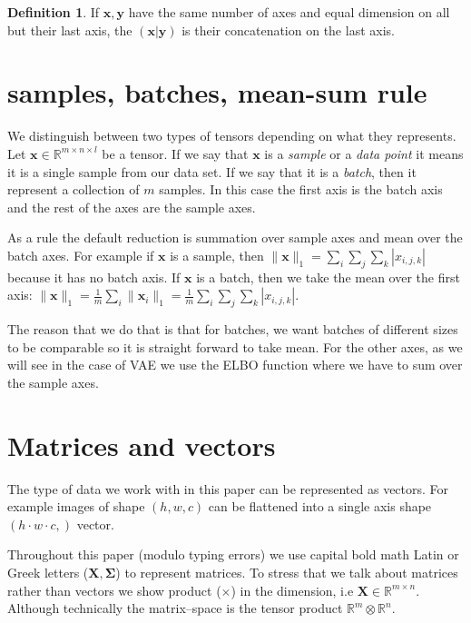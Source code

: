\documentclass[11pt, a4paper]{report}
\theoremstyle{plain}
\theoremstyle{definition}
\newtheorem{mydef}{Definition}[chapter]
\theoremstyle{remark}
\newcommand{\R}{\mathbb{R}}
\newcommand{\x}{\mathbf{x}}
\newcommand{\y}{\mathbf{y}}
\newcommand{\bv}[1]{\boldsymbol{#1}}
\begin{document}
\begin{mydef}
\label{def:concat}
If $\x,\y$ have the same number of axes and equal dimension on all but their last axis, 
the $(\x|\y)$ is their concatenation on the last axis. 
\end{mydef}

\section{samples, batches, mean-sum rule}

We distinguish between two types of tensors depending on what they represents.
Let $\x \in \R^{m \times n \times l}$ be a tensor.
If we say that $\x$ is a \emph{sample} or a \emph{data point} it means it is a
single sample from our data set. If we say that it is a \emph{batch}, then 
it represent a collection of $m$ samples. In this case the first axis is the batch
axis and the rest of the axes are the sample axes.

As a rule the default reduction is summation over sample axes 
and mean over the batch axes.
For example if $\x$ is a sample, 
then $\|\x \|_1 = \sum_i \sum_j \sum_k |x_{i,j,k}|$ because it has no batch axis.
If $\x$ is a batch, then we take the mean over the first axis:
$\| \x \|_1 = \frac{1}{m} \sum_i \| \x_i \|_1 = \frac{1}{m} \sum_i \sum_j \sum_k |x_{i,j,k}|$.

The reason that we do that is that for batches, we want batches of different
sizes to be comparable so it is straight forward to take mean. For the other
axes, as we will see in the case of VAE we use the ELBO function where we have
to sum over the sample axes.

\label{meansumrule}


\section{Matrices and vectors}

The type of data we work with in this paper can be represented as vectors.
For example images of shape $(h,w,c)$ can be flattened into a single axis shape
$(h \cdot w \cdot c,)$ vector.

Throughout this paper (modulo typing errors) we use
capital bold math Latin or Greek letters ($\bv{X, \Sigma}$) to represent
matrices. To stress that we talk about matrices rather than vectors we show
product ($\times$) in the dimension, i.e $\bv{X} \in \R^{m \times n}$. Although
technically the matrix--space is the tensor product $\R^m \otimes \R^n$.
\end{document}

